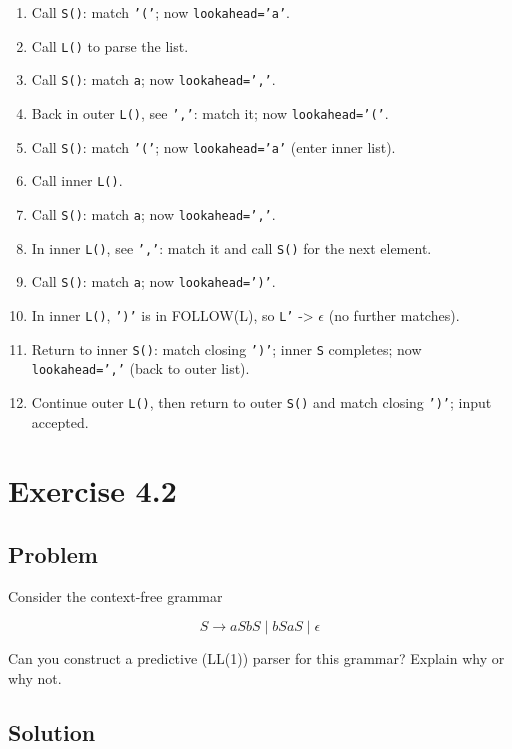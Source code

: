 \begin{enumerate}
	\item Call \texttt{S()}: match \texttt{'('}; now \texttt{lookahead='a'}.
	\item Call \texttt{L()} to parse the list.
	\item Call \texttt{S()}: match \texttt{a}; now \texttt{lookahead=','}.
	\item Back in outer \texttt{L()}, see \texttt{','}: match it; now \texttt{lookahead='('}.
	\item Call \texttt{S()}: match \texttt{'('}; now \texttt{lookahead='a'} (enter inner list).
	\item Call inner \texttt{L()}.
	\item Call \texttt{S()}: match \texttt{a}; now \texttt{lookahead=','}.
	\item In inner \texttt{L()}, see \texttt{','}: match it and call \texttt{S()} for the next element.
	\item Call \texttt{S()}: match \texttt{a}; now \texttt{lookahead=')'}.
	\item In inner \texttt{L()}, \texttt{')'} is in FOLLOW(L), so \texttt{L'} -> \(\epsilon\) (no further matches).
	\item Return to inner \texttt{S()}: match closing \texttt{')'}; inner \texttt{S} completes; now \texttt{lookahead=','} (back to outer list).
	\item Continue outer \texttt{L()}, then return to outer \texttt{S()} and match closing \texttt{')'}; input accepted.
\end{enumerate}

\chapter{Exercise 4.2}

\section{Problem}

Consider the context-free grammar

\[
S \to a S b S \;|\; b S a S \;|\; \epsilon
\]

Can you construct a predictive (LL(1)) parser for this grammar? Explain why or why not.

\section{Solution}


